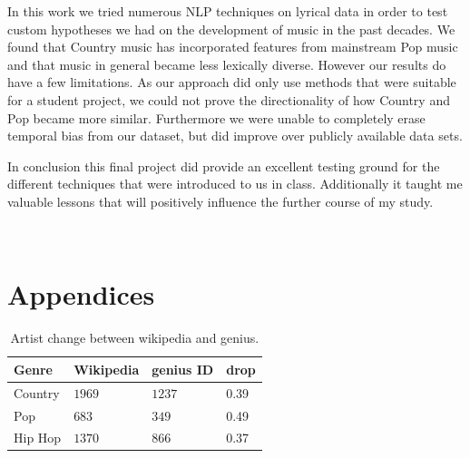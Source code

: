 \documentclass[11pt,a4paper]{article}
\begin{document}
In this work we tried numerous NLP techniques on lyrical data in order to test custom hypotheses we had on the development of music in the past decades. 
We found that Country music has incorporated features from mainstream Pop music and that music in general became less lexically diverse. 
However our results do have a few limitations. As our approach did only use methods that were suitable for a student project, we could not prove the directionality of how Country and Pop became more similar.
Furthermore we were unable to completely erase temporal bias from our dataset, but did improve over publicly available data sets.

In conclusion this final project did provide an excellent testing ground for the different techniques that were introduced to us in class. Additionally it taught me valuable lessons that will positively influence the further course of my study.





\
\appendix

\section{Appendices}\label{sec:appendix}
\begin{table}[h!]
\begin{tabular}{llll}
\hline
Genre & Wikipedia & genius ID & drop \\ \hline 
Country & $1969$ & $1237$ & 0.39 \\
Pop & $683$ & $349$ & 0.49 \\
Hip Hop & $1370$ & $866$ & 0.37 \\ \hline
\end{tabular}
\caption{Artist change between wikipedia and genius.}
\label{tab:scrape:idscomp}
\end{table}
\end{document}
